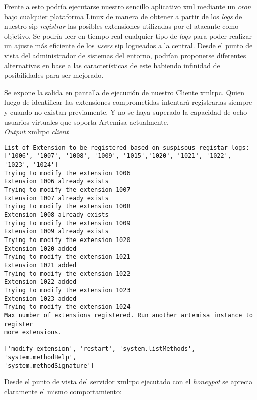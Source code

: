 \documentclass[a4paper,12pt]{report}
\newenvironment{myscriptlisting}
{\begin{list}{}{\setlength{\leftmargin}{1em}}\item\scriptsize\bfseries}
{\end{list}}
\begin{document}
Frente a esto podría ejecutarse nuestro sencillo aplicativo \ac{xml} mediante un
\emph{cron} bajo cualquier plataforma Linux de manera de obtener a partir de los \emph{logs}
de nuestro \ac{sip} \emph{registrar} las posibles extensiones utilizadas por el
atacante como objetivo. Se podría leer en tiempo real cualquier tipo de \emph{logs}
para poder realizar un ajuste más eficiente de los \emph{users} \ac{sip} logueados a la
central. Desde el punto de vista del administrador de sistemas del entorno,
podrían proponerse diferentes alternativas en base a las características de
este habiendo infinidad de posibilidades para ser mejorado.

Se expone la salida en pantalla de ejecución de nuestro Cliente \ac{xmlrpc}. Quien
luego de identificar las extensiones comprometidas intentará registrarlas
siempre y cuando no existan previamente. Y no se haya superado la capacidad de
ocho usuarios virtuales que soporta Artemisa actualmente.\\

\emph{Output} \ac{xmlrpc} \emph{client}
\begin{myscriptlisting}   
  \begin{verbatim}
List of Extension to be registered based on suspisous registar logs:
['1006', '1007', '1008', '1009', '1015','1020', '1021', '1022', '1023', '1024']
Trying to modify the extension 1006
Extension 1006 already exists
Trying to modify the extension 1007
Extension 1007 already exists
Trying to modify the extension 1008
Extension 1008 already exists
Trying to modify the extension 1009
Extension 1009 already exists
Trying to modify the extension 1020
Extension 1020 added
Trying to modify the extension 1021
Extension 1021 added
Trying to modify the extension 1022
Extension 1022 added
Trying to modify the extension 1023
Extension 1023 added
Trying to modify the extension 1024
Max number of extensions registered. Run another artemisa instance to register
more extensions.

['modify_extension', 'restart', 'system.listMethods', 'system.methodHelp',
'system.methodSignature']
  \end{verbatim}
\end{myscriptlisting}

Desde el punto de vista del servidor \ac{xmlrpc} ejecutado con el \emph{honeypot}
se aprecia claramente el mismo comportamiento:\\ 
\end{document}

